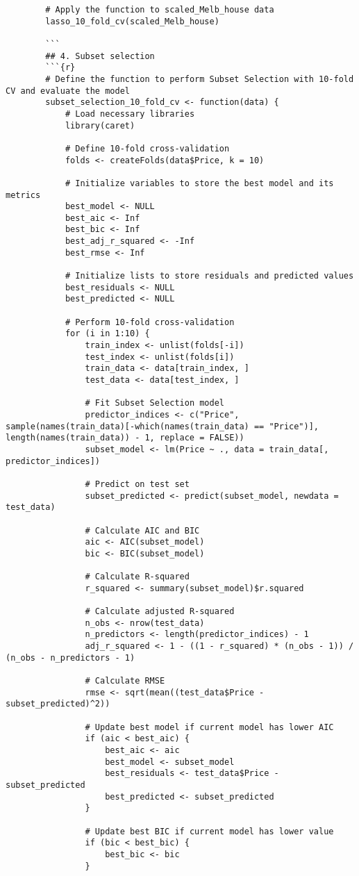 \documentclass[12pt,doublespace]{article}
\begin{document}
\begin{lstlisting}
		# Apply the function to scaled_Melb_house data
		lasso_10_fold_cv(scaled_Melb_house)
		
		```
		## 4. Subset selection
		```{r}
		# Define the function to perform Subset Selection with 10-fold CV and evaluate the model
		subset_selection_10_fold_cv <- function(data) {
			# Load necessary libraries
			library(caret)
			
			# Define 10-fold cross-validation
			folds <- createFolds(data$Price, k = 10)
			
			# Initialize variables to store the best model and its metrics
			best_model <- NULL
			best_aic <- Inf
			best_bic <- Inf
			best_adj_r_squared <- -Inf
			best_rmse <- Inf
			
			# Initialize lists to store residuals and predicted values
			best_residuals <- NULL
			best_predicted <- NULL
			
			# Perform 10-fold cross-validation
			for (i in 1:10) {
				train_index <- unlist(folds[-i])
				test_index <- unlist(folds[i])
				train_data <- data[train_index, ]
				test_data <- data[test_index, ]
				
				# Fit Subset Selection model
				predictor_indices <- c("Price", sample(names(train_data)[-which(names(train_data) == "Price")], length(names(train_data)) - 1, replace = FALSE))
				subset_model <- lm(Price ~ ., data = train_data[, predictor_indices])
				
				# Predict on test set
				subset_predicted <- predict(subset_model, newdata = test_data)
				
				# Calculate AIC and BIC
				aic <- AIC(subset_model)
				bic <- BIC(subset_model)
				
				# Calculate R-squared
				r_squared <- summary(subset_model)$r.squared
				
				# Calculate adjusted R-squared
				n_obs <- nrow(test_data)
				n_predictors <- length(predictor_indices) - 1
				adj_r_squared <- 1 - ((1 - r_squared) * (n_obs - 1)) / (n_obs - n_predictors - 1)
				
				# Calculate RMSE
				rmse <- sqrt(mean((test_data$Price - subset_predicted)^2))
				
				# Update best model if current model has lower AIC
				if (aic < best_aic) {
					best_aic <- aic
					best_model <- subset_model
					best_residuals <- test_data$Price - subset_predicted
					best_predicted <- subset_predicted
				}
				
				# Update best BIC if current model has lower value
				if (bic < best_bic) {
					best_bic <- bic
				}
				

\end{lstlisting}
\end{document}
